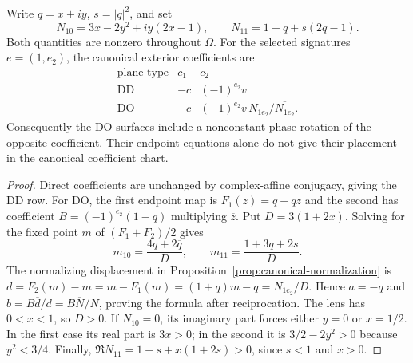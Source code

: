 \begin{proposition}
\label{prop:four-exterior-surfaces}
Write $q=x+iy$, $s=|q|^2$, and set
\[
 N_{10}=3x-2y^2+iy(2x-1),\qquad
 N_{11}=1+q+s(2q-1).
\]
Both quantities are nonzero throughout $\Omega$. For the selected
signatures $e=(1,e_2)$, the canonical exterior coefficients are
\begin{equation}\label{eq:four-exterior-surfaces}
\begin{array}{c|cc}
\text{plane type}&c_1&c_2\\\hline
\mathrm{DD}&-c&(-1)^{e_2}v\\[2pt]
\mathrm{DO}&-c&(-1)^{e_2}v\,N_{1e_2}/\overline{N_{1e_2}}.
\end{array}
\end{equation}
Consequently the DO surfaces include a nonconstant phase rotation of
the opposite coefficient. Their endpoint equations alone do not give
their placement in the canonical coefficient chart.
\end{proposition}
\begin{proof}
Direct coefficients are unchanged by complex-affine conjugacy, giving
the DD row. For DO, the first endpoint map is $F_1(z)=q-qz$ and the
second has coefficient $B=(-1)^{e_2}(1-q)$ multiplying $\overline z$.
Put $D=3(1+2x)$. Solving for the fixed point $m$ of
$(F_1+F_2)/2$ gives
\[
 m_{10}=\frac{4q+2\overline q}{D},\qquad
 m_{11}=\frac{1+3q+2s}{D}.
\]
The normalizing displacement in
Proposition~\ref{prop:canonical-normalization} is
$d=F_2(m)-m=m-F_1(m)=(1+q)m-q=N_{1e_2}/D$.
Hence $a=-q$ and $b=B\overline d/d=B\overline N/N$, proving
the formula after reciprocation. The lens has $0<x<1$, so $D>0$.
If $N_{10}=0$, its imaginary part forces either $y=0$ or $x=1/2$.
In the first case its real part is $3x>0$; in the second it is
$3/2-2y^2>0$ because $y^2<3/4$. Finally,
$\Re N_{11}=1-s+x(1+2s)>0$, since $s<1$ and $x>0$.
\end{proof}

